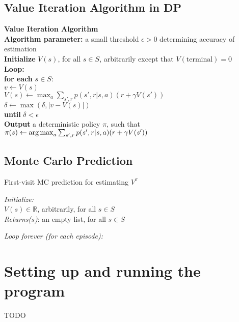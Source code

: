 \section{Value Iteration Algorithm in DP}
\begin{algorithm}[H]
    \label{alg:value-iteration}
    \SetAlgoLined
    \textbf{Value Iteration Algorithm}\\
    \textbf{Algorithm parameter:} a small threshold $\epsilon > 0$ determining accuracy of estimation\\
    \textbf{Initialize} $V(s)$, for all $s \in S$, arbitrarily except that $V(\text{terminal}) = 0$\\
    \textbf{Loop:}\\
    \quad \textbf{for each} $s \in S:$\\
    \quad \quad $v \leftarrow V(s)$\\
    \quad \quad $V(s) \leftarrow \max_a \sum_{s', r} p(s', r|s, a)(r + \gamma V(s'))$\\
    \quad \quad $\delta \leftarrow \max(\delta, |v - V(s)|)$\\
    \textbf{until} $\delta < \epsilon$\\
    \textbf{Output} a deterministic policy $\pi$, such that\\
    $\pi(s) \leftarrow \operatorname*{arg\,max}_a \sum_{s', r} p(s', r|s, a)(r + \gamma V(s'))$\\
\end{algorithm}


\section{Monte Carlo Prediction}
\begin{algorithm}[h!]
    \caption{First-visit MC prediction for estimating $V^\pi$}
    \label{alg:mc}



    \emph{Initialize:}\\
    $V(s) \in \mathbb{R}$, arbitrarily, for all $s \in S$\\
    \emph{Returns($s$)}: an empty list, for all $s \in S$

    \emph{Loop forever (for each episode):}\\
\end{algorithm}


\chapter{Setting up and running the program}
TODO
